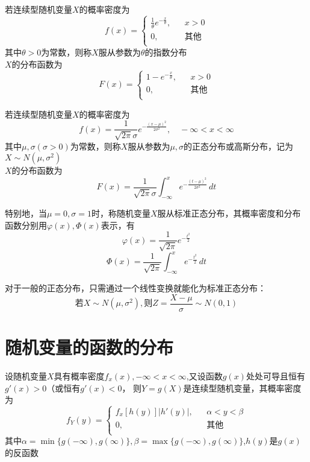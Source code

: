 \begin{definition}[指数分布]
    若连续型随机变量$X$的概率密度为
    $$ f(x)=\left\{
        \begin{array}{lll}
        \frac{1}{\theta}e^{-\frac{x}{\theta}}, &  & x>0\\
        0,&  &  \mbox{其他} \\
        \end{array}\right. $$
    其中$\theta>0$为常数，则称$X$服从参数为$\theta$的指数分布\\
    $X$的分布函数为
    $$ F(x)=\left\{
        \begin{array}{lll}
        1-e^{-\frac{x}{\theta}}, &  &x>0\\
        0,&  &  \mbox{其他} \\
        \end{array}\right. $$
\end{definition}

\begin{definition}[正态分布]
    若连续型随机变量$X$的概率密度为
    $$f(x)=\frac{1}{\sqrt{2\pi}\sigma}e^{-\frac{{(x-\mu)}^2}{2\sigma^2}}, \quad -\infty<x<\infty$$
    其中$\mu,\sigma(\sigma>0)$为常数，则称$X$服从参数为$\mu,\sigma$的正态分布或高斯分布，记为$X\sim N(\mu,\sigma^2)$\\
    $X$的分布函数为
    $$F(x)=\frac{1}{\sqrt{2\pi}\sigma}\int_{-\infty}^{x} e^{-\frac{{(t-\mu)}^2}{2\sigma^2}} \,dt $$

    特别地，当$\mu=0,\sigma=1$时，称随机变量$X$服从{\heiti 标准正态分布}，其概率密度和分布函数分别用$\varphi(x),\varPhi(x)$表示，有
    $$ \varphi(x)=\frac{1}{\sqrt{2\pi}}e^{-\frac{t^2}{2}}$$
    $$ \varPhi(x)=\frac{1}{\sqrt{2\pi}}\int_{-\infty}^x e^{-\frac{t^2}{2}} \,dt$$

    对于一般的正态分布，只需通过一个线性变换就能化为标准正态分布：
    $$\mbox{若}X\sim N(\mu,\sigma^2),\mbox{则}Z=\frac{X-\mu}{\sigma}\sim N(0,1)$$
\end{definition}

\section{随机变量的函数的分布}
\begin{theorem}
    设随机变量$X$具有概率密度$f_x(x),-\infty<x<\infty$,又设函数$g(x)$处处可导且恒有$g'(x)>0$（或恒有$g'(x)<0$，
    则$Y=g(X)$是连续型随机变量，其概率密度为
    $$f_Y(y)=\left\{
        \begin{array}{lll}
        f_x[h(y)]|h'(y)|, &  &\alpha<y<\beta\\
        0,&  &  \mbox{其他} \\
        \end{array}\right. $$
    其中$\alpha=\min\{g(-\infty),g(\infty)\},\beta=\max\{g(-\infty),g(\infty)\}$,$h(y)$是$g(x)$的反函数
\end{theorem}